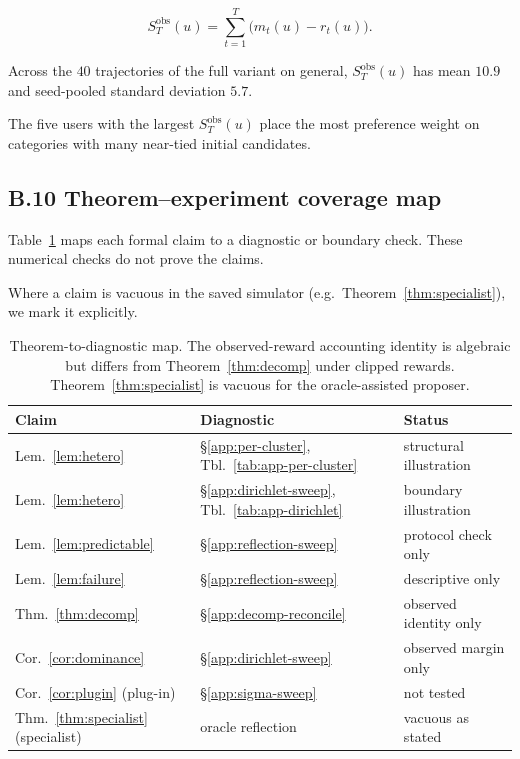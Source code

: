 \documentclass{article} %
\begin{document}
\begin{equation}
\label{eq:app-per-user-residual}
S_T^{\mathrm{obs}}(u)
=
\sum_{t=1}^{T}\big(m_t(u)-r_t(u)\big).
\end{equation}

Across the \(40\) trajectories of the full variant on general,
\(S_T^{\mathrm{obs}}(u)\) has mean \(10.9\) and seed-pooled standard deviation
\(5.7\).

The five users with the largest \(S_T^{\mathrm{obs}}(u)\) place the most
preference weight on categories with many near-tied initial candidates.

\subsection{B.10 Theorem--experiment coverage map}

\label{app:coverage-map}

Table~\ref{tab:app-coverage-sweeps} maps each formal claim to a diagnostic or
boundary check. These numerical checks do not prove the claims.

Where a claim is vacuous in the saved simulator (e.g.\ Theorem~\ref{thm:specialist}), we mark it explicitly.

\begin{table}[h]
\centering
\small
\begin{tabular}{lll}
\toprule
Claim & Diagnostic & Status \\
\midrule
Lem.~\ref{lem:hetero} & \S\ref{app:per-cluster}, Tbl.~\ref{tab:app-per-cluster} & structural illustration \\
Lem.~\ref{lem:hetero} & \S\ref{app:dirichlet-sweep}, Tbl.~\ref{tab:app-dirichlet} & boundary illustration \\
Lem.~\ref{lem:predictable} & \S\ref{app:reflection-sweep} & protocol check only \\
Lem.~\ref{lem:failure} & \S\ref{app:reflection-sweep} & descriptive only \\
Thm.~\ref{thm:decomp} & \S\ref{app:decomp-reconcile} & observed identity only \\
Cor.~\ref{cor:dominance} & \S\ref{app:dirichlet-sweep} & observed margin only \\
Cor.~\ref{cor:plugin} (plug-in) & \S\ref{app:sigma-sweep} & not tested \\
Thm.~\ref{thm:specialist} (specialist) & oracle reflection & vacuous as stated \\
\bottomrule
\end{tabular}
\caption{Theorem-to-diagnostic map. The observed-reward accounting identity is
algebraic but differs from Theorem~\ref{thm:decomp} under clipped rewards.
Theorem~\ref{thm:specialist} is vacuous for the oracle-assisted proposer.}
\label{tab:app-coverage-sweeps}
\end{table}
\end{document}
